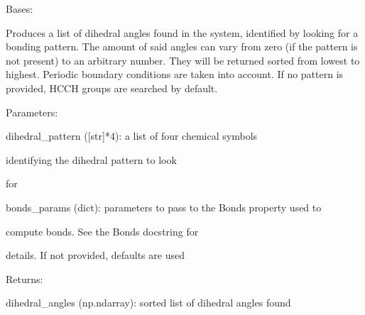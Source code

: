 \documentclass[letterpaper,10pt,english]{sphinxmanual}
\begin{document}
\begin{fulllineitems}
\label{doctree/soprano.properties.linkage.linkage:soprano.properties.linkage.linkage.DihedralAngleList}
Bases: {\hyperref[doctree/soprano.properties.atomsproperty:soprano.properties.atomsproperty.AtomsProperty]{}}

Produces a list of dihedral angles found in the system, identified by
looking for a bonding pattern. The amount of said angles can vary from
zero (if the pattern is not present) to an arbitrary number. They will be
returned sorted from lowest to highest. Periodic boundary conditions are
taken into account. If no pattern is provided, HCCH groups are searched by
default.

\begin{DUlineblock}{0em}
\item[] Parameters:
\item[]
\begin{DUlineblock}{\DUlineblockindent}
\item[] dihedral\_pattern ({[}str{]}*4): a list of four chemical symbols
\item[]
\begin{DUlineblock}{\DUlineblockindent}
\item[] identifying the dihedral pattern to look
\item[] for
\end{DUlineblock}
\item[] bonds\_params (dict): parameters to pass to the Bonds property used to
\item[]
\begin{DUlineblock}{\DUlineblockindent}
\item[] compute bonds. See the Bonds docstring for
\item[] details. If not provided, defaults are used
\end{DUlineblock}
\end{DUlineblock}
\end{DUlineblock}

\begin{DUlineblock}{0em}
\item[] Returns:
\item[]
\begin{DUlineblock}{\DUlineblockindent}
\item[] dihedral\_angles (np.ndarray): sorted list of dihedral angles found
\end{DUlineblock}
\end{DUlineblock}


\end{fulllineitems}
\end{document}
